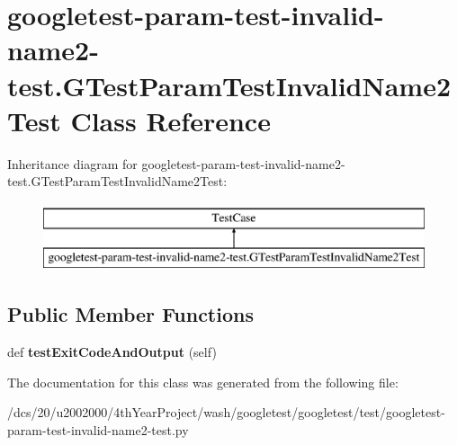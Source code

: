 \hypertarget{classgoogletest-param-test-invalid-name2-test_1_1GTestParamTestInvalidName2Test}{}\section{googletest-\/param-\/test-\/invalid-\/name2-\/test.G\+Test\+Param\+Test\+Invalid\+Name2\+Test Class Reference}
\label{classgoogletest-param-test-invalid-name2-test_1_1GTestParamTestInvalidName2Test}
Inheritance diagram for googletest-\/param-\/test-\/invalid-\/name2-\/test.G\+Test\+Param\+Test\+Invalid\+Name2\+Test\+:\begin{figure}[H]
\begin{center}
\leavevmode
\includegraphics[height=2.000000cm]{classgoogletest-param-test-invalid-name2-test_1_1GTestParamTestInvalidName2Test}
\end{center}
\end{figure}
\subsection*{Public Member Functions}
\begin{DoxyCompactItemize}
\item 
\mbox{\label{classgoogletest-param-test-invalid-name2-test_1_1GTestParamTestInvalidName2Test_a3fbc22a46315dc7ba10f0203349de7c7}} 
def {\bfseries test\+Exit\+Code\+And\+Output} (self)
\end{DoxyCompactItemize}


The documentation for this class was generated from the following file\+:\begin{DoxyCompactItemize}
\item 
/dcs/20/u2002000/4th\+Year\+Project/wash/googletest/googletest/test/googletest-\/param-\/test-\/invalid-\/name2-\/test.\+py\end{DoxyCompactItemize}
